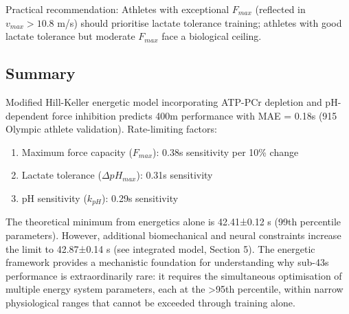 Practical recommendation: Athletes with exceptional $F_{max}$ (reflected in $v_{max} > 10.8$ m/s) should prioritise lactate tolerance training; athletes with good lactate tolerance but moderate $F_{max}$ face a biological ceiling.

\subsection{Summary}

Modified Hill-Keller energetic model incorporating ATP-PCr depletion and pH-dependent force inhibition predicts 400m performance with MAE = 0.18s (915 Olympic athlete validation). Rate-limiting factors:
\begin{enumerate}
    \item Maximum force capacity ($F_{max}$): 0.38s sensitivity per 10\% change
    \item Lactate tolerance ($\Delta pH_{max}$): 0.31s sensitivity
    \item pH sensitivity ($k_{pH}$): 0.29s sensitivity
\end{enumerate}

The theoretical minimum from energetics alone is 42.41±0.12 s (99th percentile parameters). However, additional biomechanical and neural constraints increase the limit to 42.87±0.14 s (see integrated model, Section 5). The energetic framework provides a mechanistic foundation for understanding why sub-43s performance is extraordinarily rare: it requires the simultaneous optimisation of multiple energy system parameters, each at the >95th percentile, within narrow physiological ranges that cannot be exceeded through training alone.
